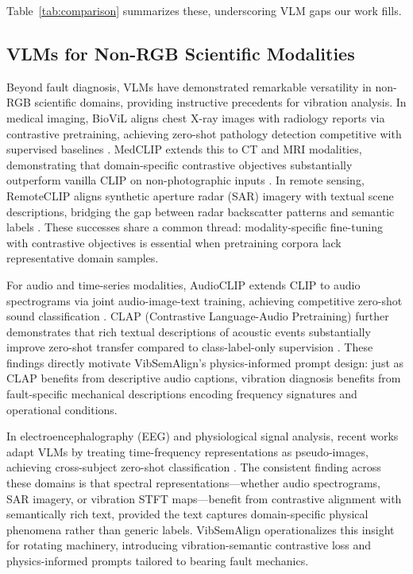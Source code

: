 Table~\ref{tab:comparison} summarizes these, underscoring VLM gaps our work fills.

\subsection{VLMs for Non-RGB Scientific Modalities}

Beyond fault diagnosis, VLMs have demonstrated remarkable versatility in non-RGB scientific domains, providing instructive precedents for vibration analysis. In medical imaging, BioViL aligns chest X-ray images with radiology reports via contrastive pretraining, achieving zero-shot pathology detection competitive with supervised baselines \cite{boecking2022making}. MedCLIP extends this to CT and MRI modalities, demonstrating that domain-specific contrastive objectives substantially outperform vanilla CLIP on non-photographic inputs \cite{wang2022medclip}. In remote sensing, RemoteCLIP aligns synthetic aperture radar (SAR) imagery with textual scene descriptions, bridging the gap between radar backscatter patterns and semantic labels \cite{liu2024remoteclip}. These successes share a common thread: modality-specific fine-tuning with contrastive objectives is essential when pretraining corpora lack representative domain samples.

For audio and time-series modalities, AudioCLIP extends CLIP to audio spectrograms via joint audio-image-text training, achieving competitive zero-shot sound classification \cite{guzhov2022audioclip}. CLAP (Contrastive Language-Audio Pretraining) further demonstrates that rich textual descriptions of acoustic events substantially improve zero-shot transfer compared to class-label-only supervision \cite{elizalde2023clap}. These findings directly motivate VibSemAlign's physics-informed prompt design: just as CLAP benefits from descriptive audio captions, vibration diagnosis benefits from fault-specific mechanical descriptions encoding frequency signatures and operational conditions.

In electroencephalography (EEG) and physiological signal analysis, recent works adapt VLMs by treating time-frequency representations as pseudo-images, achieving cross-subject zero-shot classification \cite{li2024eegclip}. The consistent finding across these domains is that spectral representations—whether audio spectrograms, SAR imagery, or vibration STFT maps—benefit from contrastive alignment with semantically rich text, provided the text captures domain-specific physical phenomena rather than generic labels. VibSemAlign operationalizes this insight for rotating machinery, introducing vibration-semantic contrastive loss and physics-informed prompts tailored to bearing fault mechanics.

